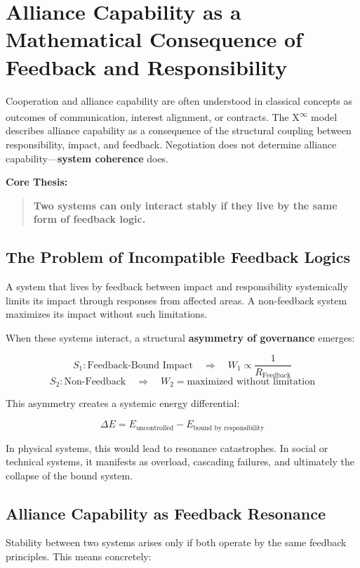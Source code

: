 \documentclass[12pt,a4paper]{article}
\begin{document}
\section{Alliance Capability as a Mathematical Consequence of Feedback and Responsibility}

Cooperation and alliance capability are often understood in classical concepts as outcomes of communication, interest alignment, or contracts.  
The \texorpdfstring{X\textsuperscript{\(\infty\)}}{X-Infinity} model describes alliance capability as a consequence of the structural coupling between responsibility, impact, and feedback.  
Negotiation does not determine alliance capability—\textbf{system coherence} does.

\textbf{Core Thesis:}  
\begin{quote}
\textbf{Two systems can only interact stably if they live by the same form of feedback logic.}
\end{quote}

\subsection{The Problem of Incompatible Feedback Logics}

A system that lives by feedback between impact and responsibility systemically limits its impact through responses from affected areas.  
A non-feedback system maximizes its impact without such limitations.

When these systems interact, a structural \textbf{asymmetry of governance} emerges:

\[
S_1 : \text{Feedback-Bound Impact} \quad \Rightarrow \quad W_1 \propto \frac{1}{R_{\text{Feedback}}}
\]
\[
S_2 : \text{Non-Feedback} \quad \Rightarrow \quad W_2 = \text{maximized without limitation}
\]

This asymmetry creates a systemic energy differential:

\[
\Delta E = E_{\text{uncontrolled}} - E_{\text{bound by responsibility}}
\]

In physical systems, this would lead to resonance catastrophes. In social or technical systems, it manifests as overload, cascading failures, and ultimately the collapse of the bound system.

\subsection{Alliance Capability as Feedback Resonance}

Stability between two systems arises only if both operate by the same feedback principles.  
This means concretely:
\end{document}
